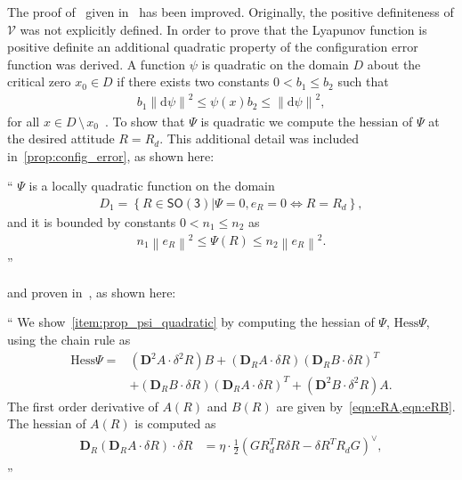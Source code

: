 \documentclass[11pt]{article}
\newcommand{\norm}[1]{\ensuremath{\left\| #1 \right\|}}
\newcommand{\braces}[1]{\ensuremath{\left\{ #1 \right\}}}
\newcommand{\parenth}[1]{\ensuremath{\left( #1 \right)}}
\newcommand{\dirDiff}[2]{\ensuremath{\mathbf{D}_{#2} #1 \cdot \delta #2}} %
\newcommand{\SO}{\ensuremath{\mathsf{SO(3)}}}
\newcommand{\Hess}{\ensuremath{\mathrm{Hess}}}
\newenvironment{correction}{\begin{list}{}{\setlength{\leftmargin}{1cm}\setlength{\rightmargin}{1cm}}\vspace{\parsep}\item[]``}{''\end{list}}
\begin{document}
\begin{enumerate}
The proof of~ given in~ has been improved. 
Originally, the positive definiteness of \( \mathcal{V}\) was not explicitly defined. 
In order to prove that the Lyapunov function is positive definite an additional quadratic property of the configuration error function was derived.
A function \( \psi \) is quadratic on the domain \( D \) about the critical zero \( x_0 \in D \) if there exists two constants \( 0 < b_1 \leq b_2 \) such that
\begin{align*}
    b_1 \norm{\text{d} \psi}^2 \leq \psi(x) b_2 \leq \norm{\text{d} \psi}^2 ,
\end{align*}
for all \( x \in D \, \setminus \, x_0\)~\cite[Definition 6.28]{bullo2004}.
To show that \( \Psi \) is quadratic we compute the hessian of \( \Psi \) at the desired attitude \( R = R_d \).
This additional detail was included in~\cref{prop:config_error}, as shown here:
\begin{correction}
     \( \Psi \) is a locally quadratic function on the domain 
        \begin{align}%
            D_1 = \braces{R \in \SO \vert \Psi = 0, e_{R} = 0 \iff R = R_d } ,
        \end{align}
        and it is bounded by constants \( 0 < n_1 \leq n_2 \) as
        \begin{align}%
            n_1 \norm{e_R}^2 \leq \Psi(R) \leq n_2 \norm{e_R}^2 .
        \end{align}
\end{correction}
and proven in~, as shown here:
\begin{correction}
    We show~\cref{item:prop_psi_quadratic} by computing the hessian of \( \Psi \), \( \Hess{\Psi} \),  using the chain rule as 
    \begin{align*}
        \Hess \Psi =& \parenth{\mathbf{D}^2 A \cdot \delta^2 R} B + \parenth{\dirDiff{A}{R} }\parenth{\dirDiff{B}{R}}^T \\
        &+ \parenth{\dirDiff{B}{R} }\parenth{\dirDiff{A}{R}}^T +\parenth{\mathbf{D}^2 B \cdot \delta^2 R} A .
    \end{align*}
    The first order derivative of \( A(R) \) and \( B(R) \) are given by~\cref{eqn:eRA,eqn:eRB}. 
    The hessian of \( A(R) \) is computed as 
    \begin{align*}
        \dirDiff{\parenth{\dirDiff{A}{R}}}{R} &= \eta \cdot \frac{1}{2}\parenth{G R_d^T R \delta R - \delta R^T R_d G}^\vee , \\

\end{align*}
\end{correction}
\end{enumerate}
\end{document}
